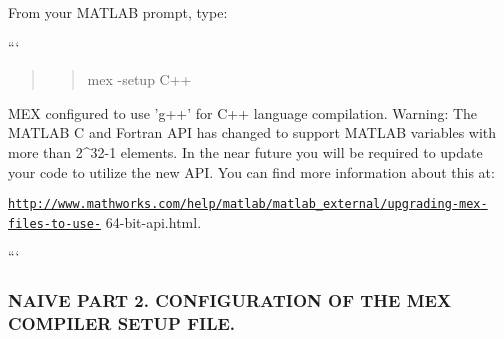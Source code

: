 \begin{DoxyPre}\end{DoxyPre}



\begin{DoxyPre}From your MATLAB prompt, type:\end{DoxyPre}



\begin{DoxyPre}```
\begin{quotation}
\begin{quotation}
mex -setup C++

\end{quotation}


\end{quotation}
MEX configured to use 'g++' for C++ language compilation.
Warning: The MATLAB C and Fortran API has changed to support MATLAB
     variables with more than 2^32-1 elements. In the near future
     you will be required to update your code to utilize the
     new API. You can find more information about this at:\end{DoxyPre}



\begin{DoxyPre}\href{http://www.mathworks.com/help/matlab/matlab_external/upgrading-mex-files-to-use-}{\tt http://www.mathworks.com/help/matlab/matlab\_external/upgrading-mex-files-to-use-}
64-bit-api.html.
\begin{quotation}
\begin{quotation}


\end{quotation}


\end{quotation}
```\end{DoxyPre}



\begin{DoxyPre}\subsubsection*{NAIVE PART 2. CONFIGURATION OF THE MEX COMPILER SETUP FILE.}\end{DoxyPre}



\begin{DoxyPre}\end{DoxyPre}






